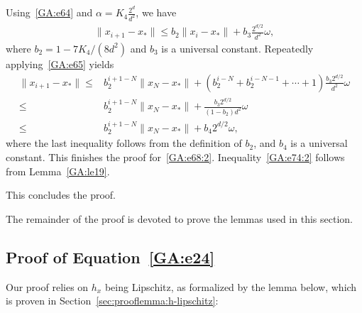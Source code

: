 \documentclass[11pt]{article}
\begin{document}
Using~\eqref{GA:e64} and $\alpha = K_4 \frac{2^d}{d^2}$, we have
\begin{align} \label{GA:e65}
\|x_{i + 1} - x_*\|\leq b_2 \|x_i - x_*\| + b_3 \frac{2^{d/2}}{d^2} \omega,
\end{align}
where $b_2 = 1 - 7 K_4 / (8 d^2)$ and $b_3$ is a universal constant. Repeatedly applying~\eqref{GA:e65} yields
\begin{align*}
\|x_{i + 1} - x_*\| \leq& b_2^{i + 1 - N} \|x_N - x_*\| + (b_2^{i-N} + b_2^{i - N - 1} + \cdots + 1) \frac{b_3 2^{d/2}}{d^2} \omega \\
\leq& b_2^{i + 1 - N} \|x_N - x_*\| + \frac{b_3 2^{d/2}}{(1 - b_2) d^2} \omega \\
\leq& b_2^{i + 1 - N} \|x_N - x_*\| + b_4 2^{d/2} \omega,
\end{align*}
where the last inequality follows from the definition of $b_2$, and $b_4$ is a universal constant. This finishes the proof for~\eqref{GA:e68:2}. Inequality~\eqref{GA:e74:2} follows from Lemma~\ref{GA:le19}.

This concludes the proof.

The remainder of the proof is devoted to prove the lemmas used in this section.

\subsection{Proof of Equation~\eqref{GA:e24}}

Our proof relies on $h_x$ being Lipschitz, as formalized by the lemma below, which is proven in Section~\ref{sec:prooflemma:h-lipschitz}:
\end{document}
